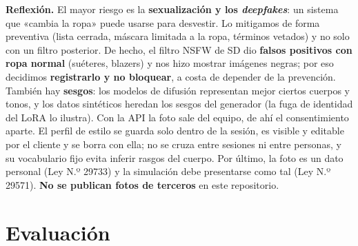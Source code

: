 \documentclass[11pt,letterpaper]{article}
\begin{document}
\textbf{Reflexión.} El mayor riesgo es la \textbf{sexualización y los \emph{deepfakes}}: un sistema que «cambia la ropa» puede
usarse para desvestir. Lo mitigamos de forma preventiva (lista cerrada, máscara limitada a la ropa, términos vetados) y
no solo con un filtro posterior. De hecho, el filtro NSFW de SD dio \textbf{falsos positivos con ropa normal} (suéteres,
blazers) y nos hizo mostrar imágenes negras; por eso decidimos \textbf{registrarlo y no bloquear}, a costa de depender de
la prevención. También hay \textbf{sesgos}: los modelos de difusión representan mejor ciertos cuerpos y tonos, y los
datos sintéticos heredan los sesgos del generador (la fuga de identidad del LoRA lo ilustra). Con la API la foto sale
del equipo, de ahí el consentimiento aparte. El perfil de estilo se guarda solo dentro de la sesión, es visible y editable
por el cliente y se borra con ella; no se cruza entre sesiones ni entre personas, y su vocabulario fijo evita inferir
rasgos del cuerpo. Por último, la foto es un dato personal (Ley N.º 29733) y la simulación debe
presentarse como tal (Ley N.º 29571). \textbf{No se publican fotos de terceros} en este repositorio.

\section{Evaluación}
\label{sec:eval}
\end{document}
